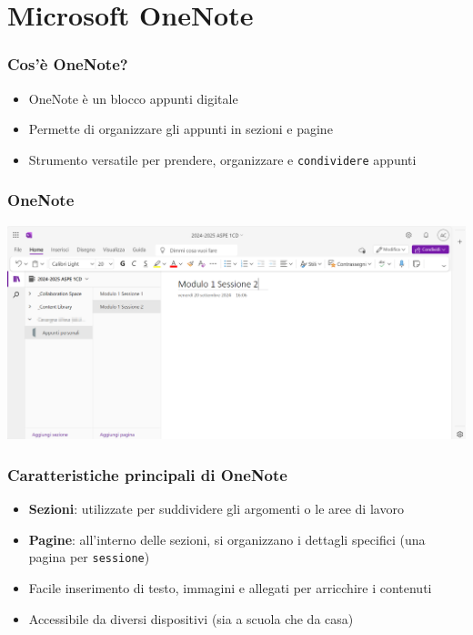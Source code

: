 \documentclass{beamer}
\begin{document}
\section{Microsoft OneNote}

\begin{frame}
  \frametitle{Cos'è OneNote?}

  \begin{itemize}
    \item OneNote è un blocco appunti digitale
    \item Permette di organizzare gli appunti in sezioni e pagine
    \item Strumento versatile per prendere, organizzare e \texttt{condividere} appunti
  \end{itemize}
\end{frame}

\begin{frame}
  \frametitle{OneNote}
  \begin{center}
    \includegraphics[width=0.9\linewidth]{images/7.png}
  \end{center}
\end{frame}


\begin{frame}
  \frametitle{Caratteristiche principali di OneNote}

  \begin{itemize}
    \item \textbf{Sezioni}: utilizzate per suddividere gli argomenti o le aree di lavoro
    \item \textbf{Pagine}: all'interno delle sezioni, si organizzano i dettagli specifici (una pagina per \texttt{sessione})
    \item Facile inserimento di testo, immagini e allegati per arricchire i contenuti
    \item Accessibile da diversi dispositivi (sia a scuola che da casa)
  \end{itemize}
\end{frame}
\end{document}
